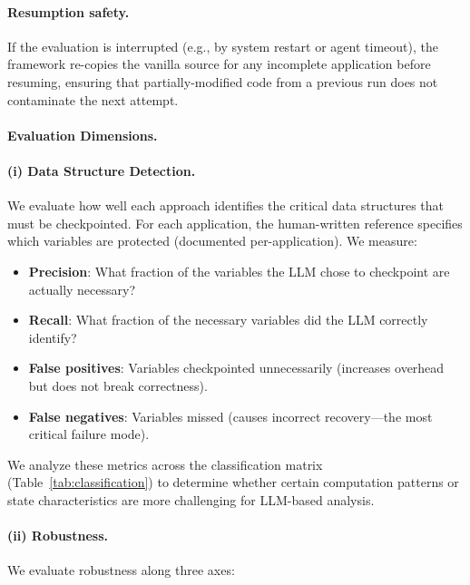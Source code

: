 \paragraph{Resumption safety.}
If the evaluation is interrupted (e.g., by system restart or agent timeout), the framework re-copies the vanilla source for any incomplete application before resuming, ensuring that partially-modified code from a previous run does not contaminate the next attempt.

\paragraph{Evaluation Dimensions.}

\paragraph{(i) Data Structure Detection.}
We evaluate how well each approach identifies the critical data structures that must be checkpointed. For each application, the human-written reference specifies which variables are protected (documented per-application). We measure:

\begin{itemize}
    \item \textbf{Precision}: What fraction of the variables the LLM chose to checkpoint are actually necessary?
    \item \textbf{Recall}: What fraction of the necessary variables did the LLM correctly identify?
    \item \textbf{False positives}: Variables checkpointed unnecessarily (increases overhead but does not break correctness).
    \item \textbf{False negatives}: Variables missed (causes incorrect recovery---the most critical failure mode).
\end{itemize}

We analyze these metrics across the classification matrix (Table~\ref{tab:classification}) to determine whether certain computation patterns or state characteristics are more challenging for LLM-based analysis.

\paragraph{(ii) Robustness.}
We evaluate robustness along three axes:

